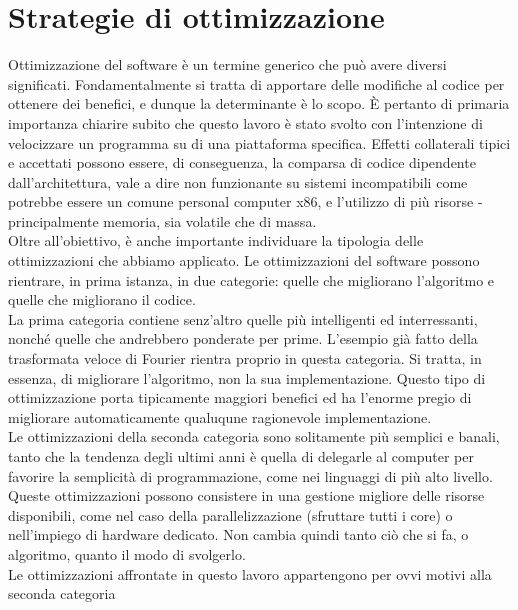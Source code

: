 \section{Strategie di ottimizzazione}
Ottimizzazione del software è un termine generico che può avere diversi 
significati. Fondamentalmente si tratta di apportare delle modifiche al codice 
per ottenere dei benefici, e dunque la determinante è lo scopo. \`E pertanto di 
primaria importanza chiarire subito che 
questo lavoro è stato svolto con l'intenzione di velocizzare un programma su 
di una piattaforma specifica. Effetti collaterali tipici e accettati possono 
essere, di conseguenza, la comparsa di codice dipendente dall'architettura, 
vale a dire non funzionante su sistemi incompatibili come potrebbe essere un 
comune 
personal computer x86, e l'utilizzo di più risorse - principalmente memoria, 
sia volatile che di massa. \\
Oltre all'obiettivo, è anche importante individuare la tipologia delle 
ottimizzazioni 
che abbiamo applicato. Le ottimizzazioni del software possono 
rientrare, in prima istanza, in due 
categorie: quelle che migliorano l'algoritmo e quelle che migliorano il codice. 
\\La prima categoria contiene senz'altro quelle più intelligenti ed 
interressanti, nonché quelle che andrebbero ponderate per prime. L'esempio già 
fatto della trasformata veloce di Fourier rientra proprio in questa categoria. 
Si tratta, in essenza, di migliorare l'algoritmo, non la sua implementazione.
Questo tipo di ottimizzazione porta tipicamente maggiori benefici ed ha 
l'enorme pregio di migliorare automaticamente qualuqune ragionevole 
implementazione.
\\Le ottimizzazioni della seconda categoria sono solitamente più semplici e 
banali, tanto che la tendenza degli ultimi anni è quella di delegarle al 
computer per favorire la semplicità di programmazione, come nei linguaggi di 
più alto livello. Queste ottimizzazioni possono consistere in una gestione 
migliore delle risorse disponibili, come nel caso della parallelizzazione 
(sfruttare tutti i core) o nell'impiego di hardware dedicato.
Non cambia quindi tanto ciò che si fa, o algoritmo, quanto il modo di 
svolgerlo.\\
Le ottimizzazioni affrontate in questo lavoro appartengono per ovvi motivi alla 
seconda categoria


